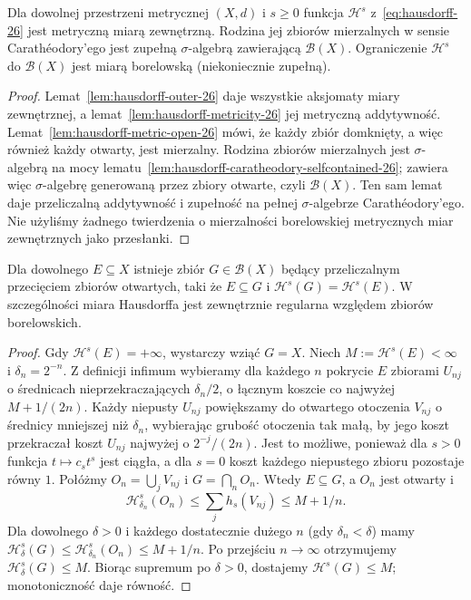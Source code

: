 \begin{twierdzenie}
\label{thm:hausdorff-borel-26}
Dla dowolnej przestrzeni metrycznej $(X,d)$ i $s\geq0$
funkcja $\mathcal H^s$ z~\eqref{eq:hausdorff-26}
jest metryczną miarą zewnętrzną. Rodzina jej zbiorów
mierzalnych w sensie Carathéodory'ego jest zupełną
$\sigma$-algebrą zawierającą $\mathcal B(X)$.
Ograniczenie $\mathcal H^s$ do $\mathcal B(X)$ jest
miarą borelowską (niekoniecznie zupełną).
\end{twierdzenie}
\begin{proof}
Lemat~\ref{lem:hausdorff-outer-26} daje
wszystkie aksjomaty miary zewnętrznej,
a lemat~\ref{lem:hausdorff-metricity-26}
jej metryczną addytywność.
Lemat~\ref{lem:hausdorff-metric-open-26} mówi, że
każdy zbiór domknięty, a więc również każdy otwarty,
jest mierzalny. Rodzina zbiorów mierzalnych jest
$\sigma$-algebrą na mocy
lematu~\ref{lem:hausdorff-caratheodory-selfcontained-26};
zawiera więc $\sigma$-algebrę generowaną przez
zbiory otwarte, czyli $\mathcal B(X)$.
Ten sam lemat daje przeliczalną addytywność
i zupełność na pełnej $\sigma$-algebrze
Carathéodory'ego. Nie użyliśmy żadnego twierdzenia
o mierzalności borelowskiej metrycznych miar zewnętrznych
jako przesłanki.
\end{proof}

\begin{twierdzenie}
\label{thm:hausdorff-gdelta-26}
Dla dowolnego $E\subseteq X$ istnieje zbiór
$G\in\mathcal B(X)$ będący przeliczalnym
przecięciem zbiorów otwartych, taki że
$E\subseteq G$ i $\mathcal H^s(G)=\mathcal H^s(E)$.
W szczególności miara Hausdorffa jest zewnętrznie
regularna względem zbiorów borelowskich.
\end{twierdzenie}
\begin{proof}
Gdy $\mathcal H^s(E)=+\infty$, wystarczy wziąć $G=X$.
Niech $M:=\mathcal H^s(E)<\infty$ i $\delta_n=2^{-n}$.
Z definicji infimum wybieramy dla każdego $n$
pokrycie $E$ zbiorami $U_{nj}$ o średnicach
nieprzekraczających $\delta_n/2$, o łącznym
koszcie co najwyżej $M+1/(2n)$.
Każdy niepusty $U_{nj}$ powiększamy do
otwartego otoczenia $V_{nj}$ o średnicy
mniejszej niż $\delta_n$, wybierając grubość
otoczenia tak małą, by jego koszt przekraczał
koszt $U_{nj}$ najwyżej o $2^{-j}/(2n)$.
Jest to możliwe, ponieważ dla $s>0$ funkcja
$t\mapsto c_st^s$ jest ciągła, a dla $s=0$
koszt każdego niepustego zbioru pozostaje równy $1$.
Połóżmy $O_n=\bigcup_jV_{nj}$ i $G=\bigcap_nO_n$.
Wtedy $E\subseteq G$, a $O_n$ jest otwarty i
\[
 \mathcal H^s_{\delta_n}(O_n)
 \leq\sum_jh_s(V_{nj})\leq M+1/n.
\]
Dla dowolnego $\delta>0$ i każdego dostatecznie
dużego $n$ (gdy $\delta_n<\delta$) mamy
$\mathcal H^s_\delta(G)\leq
\mathcal H^s_{\delta_n}(O_n)\leq M+1/n$.
Po przejściu $n\to\infty$ otrzymujemy
$\mathcal H^s_\delta(G)\leq M$.
Biorąc supremum po $\delta>0$,
dostajemy $\mathcal H^s(G)\leq M$;
monotoniczność daje równość.
\end{proof}

